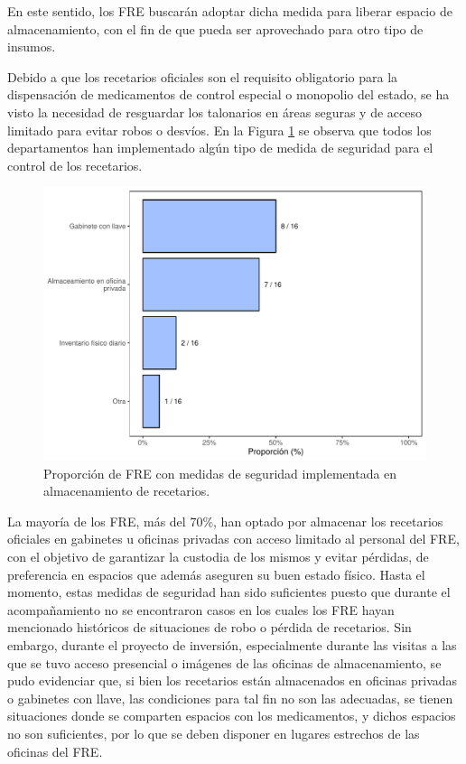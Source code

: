 \documentclass[
  oneside]{book}
\begin{document}
En este sentido, los FRE buscarán adoptar dicha medida para liberar espacio de almacenamiento, con el fin de que pueda ser aprovechado para otro tipo de insumos.

Debido a que los recetarios oficiales son el requisito obligatorio para la dispensación de medicamentos de control especial o monopolio del estado, se ha visto la necesidad de resguardar los talonarios en áreas seguras y de acceso limitado para evitar robos o desvíos. En la Figura \ref{fig:MedidasSeguridad-Almacenamiento} se observa que todos los departamentos han implementado algún tipo de medida de seguridad para el control de los recetarios.

\begin{figure}

{\centering \includegraphics[width=0.85\linewidth]{InformeFinal_files/figure-latex/MedidasSeguridad-Almacenamiento-1} 

}

\caption{Proporción de FRE con medidas de seguridad implementada en almacenamiento de recetarios.}\label{fig:MedidasSeguridad-Almacenamiento}
\end{figure}

La mayoría de los FRE, más del 70\%, han optado por almacenar los recetarios oficiales en gabinetes u oficinas privadas con acceso limitado al personal del FRE, con el objetivo de garantizar la custodia de los mismos y evitar pérdidas, de preferencia en espacios que además aseguren su buen estado físico. Hasta el momento, estas medidas de seguridad han sido suficientes puesto que durante el acompañamiento no se encontraron casos en los cuales los FRE hayan mencionado históricos de situaciones de robo o pérdida de recetarios. Sin embargo, durante el proyecto de inversión, especialmente durante las visitas a las que se tuvo acceso presencial o imágenes de las oficinas de almacenamiento, se pudo evidenciar que, si bien los recetarios están almacenados en oficinas privadas o gabinetes con llave, las condiciones para tal fin no son las adecuadas, se tienen situaciones donde se comparten espacios con los medicamentos, y dichos espacios no son suficientes, por lo que se deben disponer en lugares estrechos de las oficinas del FRE.
\end{document}
